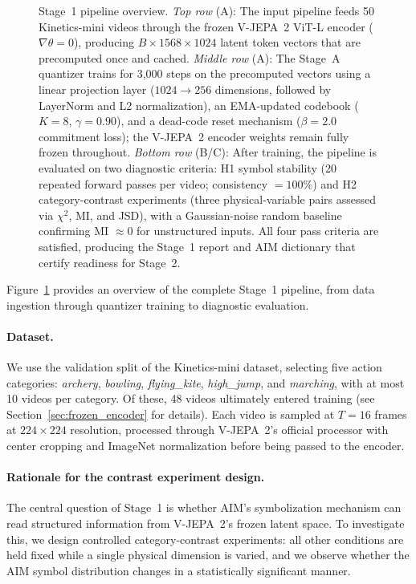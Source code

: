 \documentclass{article}
\begin{document}
\begin{figure}[H]
\begin{tikzpicture}
\end{tikzpicture}
\caption{Stage~1 pipeline overview.
         \textit{Top row} (A): The input pipeline feeds 50 Kinetics-mini
         videos through the frozen V-JEPA~2 ViT-L encoder
         ($\nabla\theta = 0$), producing $B \times 1568 \times 1024$
         latent token vectors that are precomputed once and cached.
         \textit{Middle row} (A): The Stage~A quantizer trains for 3,000
         steps on the precomputed vectors using a linear projection layer
         ($1024 \to 256$ dimensions, followed by LayerNorm and L2
         normalization), an EMA-updated codebook ($K = 8$,
         $\gamma = 0.90$), and a dead-code reset mechanism
         ($\beta = 2.0$ commitment loss); the V-JEPA~2 encoder weights
         remain fully frozen throughout.
         \textit{Bottom row} (B/C): After training, the pipeline is
         evaluated on two diagnostic criteria: H1 symbol stability
         (20 repeated forward passes per video; consistency $= 100\%$)
         and H2 category-contrast experiments (three physical-variable pairs
         assessed via $\chi^2$, MI, and JSD), with a Gaussian-noise
         random baseline confirming MI $\approx 0$ for unstructured
         inputs.  All four pass criteria are satisfied, producing the
         Stage~1 report and AIM dictionary that certify readiness for
         Stage~2.}
  \label{fig:pipeline_overview}
\end{figure}

Figure~\ref{fig:pipeline_overview} provides an overview of the
complete Stage~1 pipeline, from data ingestion through quantizer
training to diagnostic evaluation.

\paragraph{Dataset.}
We use the validation split of the Kinetics-mini dataset, selecting five action
categories: \textit{archery}, \textit{bowling}, \textit{flying\_kite},
\textit{high\_jump}, and \textit{marching}, with at most 10 videos per category.
Of these, 48 videos ultimately entered training (see Section~\ref{sec:frozen_encoder} for details).
Each video is sampled at $T = 16$ frames at $224\times224$ resolution, processed
through V-JEPA~2's official processor with center cropping and ImageNet
normalization before being passed to the encoder.

\paragraph{Rationale for the contrast experiment design.}
The central question of Stage~1 is whether AIM's symbolization mechanism can
read structured information from V-JEPA~2's frozen latent space.  To investigate
this, we design controlled category-contrast experiments: all other conditions are
held fixed while a single physical dimension is varied, and we observe whether
the AIM symbol distribution changes in a statistically significant manner.
\end{document}
